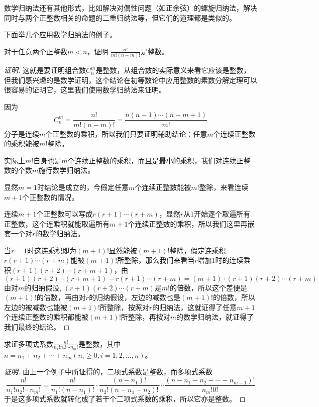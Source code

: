 数学归纳法还有其他形式，比如解决对偶性问题（如正余弦）的螺旋归纳法，解决同时与两个正整数相关的命题的二重归纳法等，但它们的道理都是类似的。

下面举几个应用数学归纳法的例子。

\begin{example}
  对于任意两个正整数$m<n$，证明 $\frac{n!}{m!(n-m)!}$是整数。

\begin{proof}[证明]
  这就是要证明组合数$C_n^m$是整数，从组合数的实际意义来看它应该是整数，但我们感兴趣的是数学证明，这个结论在初等数论中应用整数的素数分解定理可以很容易的证明它，这里我们使用数学归纳法来证明。

  因为
  \[ C_n^m = \frac{n!}{m!(n-m)!} = \frac{n(n-1)\cdots(n-m+1)}{m!} \]
  分子是连续$m$个正整数的乘积，所以我们只要证明辅助结论：任意$m$个连续正整数的乘积能被$m!$整除。

  实际上$m!$自身也是$m$个连续正整数的乘积，而且是最小的乘积，我们对连续正整数的个数$m$施行数学归纳法。

  显然$m=1$时结论是成立的，今假定任意$m$个连续正整数能被$m!$整除，来看连续$m+1$个正整数的情况。

  连续$m+1$个正整数可以写成$r(r+1)\cdots (r+m)$，显然$r$从1开始逐个取遍所有正整数，这个连乘积就能取遍所有$m+1$个连续正整数的乘积，所以我们这里再嵌套一个对$r$的数学归纳法。

  当$r=1$时这连乘积即为$(m+1)!$显然能被$(m+1)!$整除，假定连乘积$r(r+1)\cdots (r+m)$能被$(m+1)!$所整除，那么我们来看当$r$增加1时的连续乘积$(r+1)(r+2)\cdots (r+m+1)$，由
  \[ (r+1)(r+2) \cdots (r+m+1) - r(r+1) \cdots (r+m) = (m+1) \cdot (r+1)(r+2) \cdots (r+m) \]
  由对$m$的归纳假设, $(r+1)(r+2) \cdots (r+m)$是$m!$的倍数，所以这个差便是$(m+1)!$的倍数，再由对$r$的归纳假设，左边的减数也是$(m+1)!$的倍数，所以左边的被减数也能被$(m+1)!$所整除，按照对$r$的归纳法，这就证得了任意$m+1$个连续正整数的乘积都能被$(m+1)!$所整除，再按对$m$的数学归纳法，就证得了我们最终的结论。
\end{proof}
\end{example}

\begin{example}
  求证多项式系数$\frac{n!}{n_1!n_2!\cdots n_m!}$是整数，其中$n=n_1+n_2+\cdots+n_m(n_i\geqslant 0, i=1,2,\ldots,n)$。

\begin{proof}[证明]
  由上一个例子中所证得的，二项式系数是整数，而多项式系数
  \[ \frac{n!}{n_1!n_2!\cdots n_m!} = \frac{n!}{n_1!(n-n_1)!} \cdot \frac{(n-n_1)!}{n_2!(n-n_1-n_2)!} \cdots \frac{(n-n_1-n_2-\cdots-n_{m-1})!}{n_m!0!} \]
  于是这多项式系数就转化成了若干个二项式系数的乘积，所以它亦是整数。
\end{proof}
\end{example}

